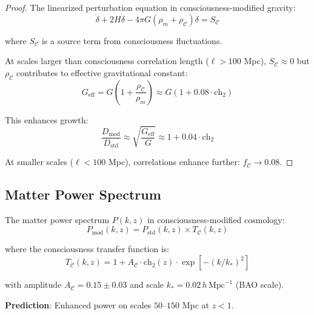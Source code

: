 \begin{proof}
The linearized perturbation equation in consciousness-modified gravity:
\begin{equation}
\ddot{\delta} + 2H \dot{\delta} - 4\pi G \left( \rho_m + \rho_{\mathcal{C}} \right) \delta = S_{\mathcal{C}}
\end{equation}

where $S_{\mathcal{C}}$ is a source term from consciousness fluctuations.

At scales larger than consciousness correlation length ($\ell > 100$ Mpc), $S_{\mathcal{C}} \approx 0$ but $\rho_{\mathcal{C}}$ contributes to effective gravitational constant:
\begin{equation}
G_{\text{eff}} = G \left( 1 + \frac{\rho_{\mathcal{C}}}{\rho_m} \right) \approx G \left( 1 + 0.08 \cdot \text{ch}_2 \right)
\end{equation}

This enhances growth:
\begin{equation}
\frac{D_{\text{mod}}}{D_{\text{std}}} \approx \sqrt{\frac{G_{\text{eff}}}{G}} \approx 1 + 0.04 \cdot \text{ch}_2
\end{equation}

At smaller scales ($\ell < 100$ Mpc), correlations enhance further: $f_{\mathcal{C}} \to 0.08$.
\end{proof}

\subsection{Matter Power Spectrum}

\begin{theorem}\label{thm:power-spectrum-modified}
The matter power spectrum $P(k, z)$ in consciousness-modified cosmology:
\begin{equation}
\boxed{P_{\text{mod}}(k, z) = P_{\text{std}}(k, z) \times T_{\mathcal{C}}(k, z)}
\end{equation}

where the consciousness transfer function is:
\begin{equation}
T_{\mathcal{C}}(k, z) = 1 + A_{\mathcal{C}} \cdot \text{ch}_2(z) \cdot \exp[-(k/k_*)^2]
\end{equation}

with amplitude $A_{\mathcal{C}} = 0.15 \pm 0.03$ and scale $k_* = 0.02 \, h \, \text{Mpc}^{-1}$ (BAO scale).

\textbf{Prediction}: Enhanced power on scales $50\text{--}150$ Mpc at $z < 1$.
\end{theorem}

